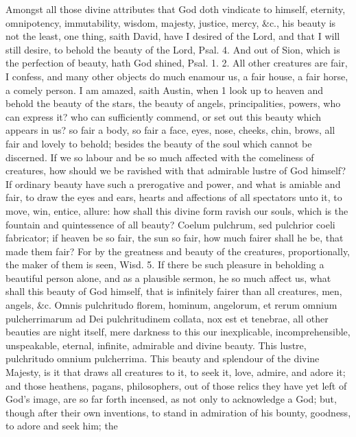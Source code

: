 {Amongst all those divine attributes that God doth vindicate to himself,
eternity, omnipotency, immutability, wisdom, majesty, justice, mercy,
\&c., his beauty is not the least, one thing, saith David, have I
desired of the Lord, and that I will still desire, to behold the beauty
of the Lord, Psal.  4. And out of Sion, which is the perfection
of beauty, hath God shined, Psal. 1. 2. All other creatures are fair, I
confess, and many other objects do much enamour us, a fair house, a
fair horse, a comely person. I am amazed, saith Austin, when 1
look up to heaven and behold the beauty of the stars, the beauty of
angels, principalities, powers, who can express it? who can
sufficiently commend, or set out this beauty which appears in us? so
fair a body, so fair a face, eyes, nose, cheeks, chin, brows, all fair
and lovely to behold; besides the beauty of the soul which cannot be
discerned. If we so labour and be so much affected with the comeliness
of creatures, how should we be ravished with that admirable lustre of
God himself? If ordinary beauty have such a prerogative and power, and
what is amiable and fair, to draw the eyes and ears, hearts and
affections of all spectators unto it, to move, win, entice, allure: how
shall this divine form ravish our souls, which is the fountain and
quintessence of all beauty? Coelum pulchrum, sed pulchrior coeli
fabricator; if heaven be so fair, the sun so fair, how much fairer
shall he be, that made them fair? For by the greatness and beauty of
the creatures, proportionally, the maker of them is seen, Wisd. 
5. If there be such pleasure in beholding a beautiful person alone, and
as a plausible sermon, he so much affect us, what shall this beauty of
God himself, that is infinitely fairer than all creatures, men, angels,
\&c.  Omnis pulchritudo florem, hominum, angelorum, et rerum
omnium pulcherrimarum ad Dei pulchritudinem collata, nox est et
tenebrae, all other beauties are night itself, mere darkness to this
our inexplicable, incomprehensible, unspeakable, eternal, infinite,
admirable and divine beauty. This lustre, pulchritudo omnium
pulcherrima. This beauty and  splendour of the divine Majesty, is
it that draws all creatures to it, to seek it, love, admire, and adore
it; and those heathens, pagans, philosophers, out of those relics they
have yet left of God's image, are so far forth incensed, as not only to
acknowledge a God; but, though after their own inventions, to stand in
admiration of his bounty, goodness, to adore and seek him; the
}
